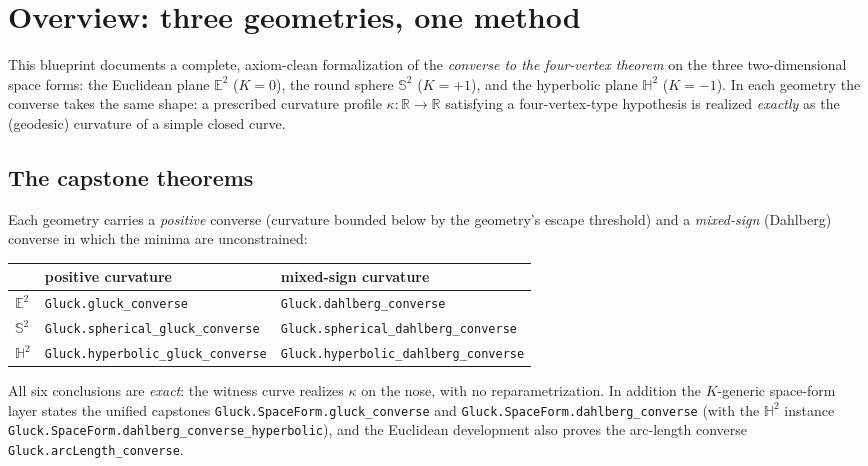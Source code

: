 \chapter{Overview: three geometries, one method}
\label{chap:overview}


This blueprint documents a complete, axiom-clean formalization of the
\emph{converse to the four-vertex theorem} on the three two-dimensional space
forms: the Euclidean plane $\mathbb{E}^2$ ($K=0$), the round sphere
$\mathbb{S}^2$ ($K=+1$), and the hyperbolic plane $\mathbb{H}^2$ ($K=-1$).
In each geometry the converse takes the same shape: a prescribed curvature
profile $\kappa\colon\mathbb{R}\to\mathbb{R}$ satisfying a four-vertex-type
hypothesis is realized \emph{exactly} as the (geodesic) curvature of a simple
closed curve.

\section{The capstone theorems}

Each geometry carries a \emph{positive} converse (curvature bounded below by
the geometry's escape threshold) and a \emph{mixed-sign} (Dahlberg) converse
in which the minima are unconstrained:

\begin{center}
\begin{tabular}{lll}
 & positive curvature & mixed-sign curvature \\
\hline
$\mathbb{E}^2$ & \texttt{Gluck.gluck\_converse} & \texttt{Gluck.dahlberg\_converse} \\
$\mathbb{S}^2$ & \texttt{Gluck.spherical\_gluck\_converse} & \texttt{Gluck.spherical\_dahlberg\_converse} \\
$\mathbb{H}^2$ & \texttt{Gluck.hyperbolic\_gluck\_converse} & \texttt{Gluck.hyperbolic\_dahlberg\_converse} \\
\end{tabular}
\end{center}

All six conclusions are \emph{exact}: the witness curve realizes $\kappa$ on
the nose, with no reparametrization. In addition the $K$-generic
space-form layer states the unified capstones
\texttt{Gluck.SpaceForm.gluck\_converse} and
\texttt{Gluck.SpaceForm.dahlberg\_converse} (with the $\mathbb{H}^2$
instance \texttt{Gluck.SpaceForm.dahlberg\_converse\_hyperbolic}), and the
Euclidean development also proves the arc-length converse
\texttt{Gluck.arcLength\_converse}.

